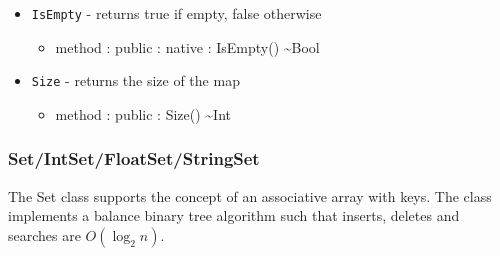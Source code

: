 \documentclass[11pt]{article}
\begin{document}
\begin{itemize}
\begin{itemize}
  \end{itemize}
\item \texttt{IsEmpty} - returns true if empty, false otherwise
  \begin{itemize}
  \item method : public : native : IsEmpty() \textasciitilde Bool
  \end{itemize}
\item \texttt{Size} - returns the size of the map
  \begin{itemize}
  \item method : public : Size() \textasciitilde Int
  \end{itemize}
\end{itemize}

\subsubsection{Set/IntSet/FloatSet/StringSet}
The Set class supports the concept of an associative array with keys.
The class implements a balance binary tree algorithm such that
inserts, deletes and searches are $O(\log_2 n)$.
\end{document}
